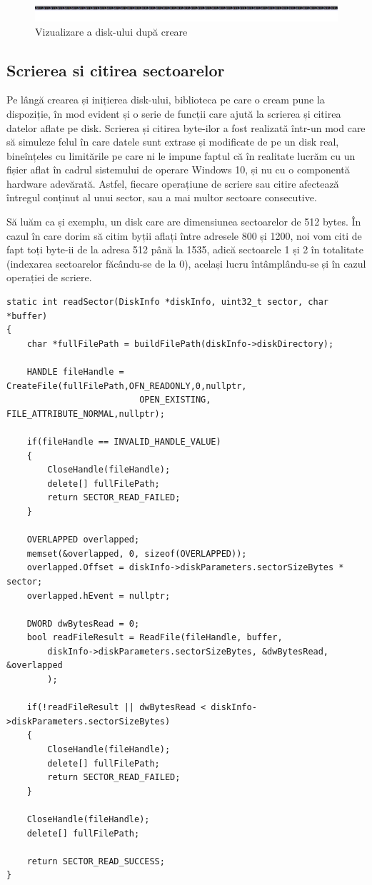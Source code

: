 \begin{figure}[h]
    \centering
    \includegraphics[width=1.0\linewidth]{images/2.2.png}
    \caption{Vizualizare a disk-ului după creare}
    \label{fig:enter-label}
\end{figure}


\subsection{Scrierea si citirea sectoarelor}

Pe lângă crearea și inițierea disk-ului, biblioteca pe care o cream pune la dispoziție, în mod evident și o serie de funcții care ajută la scrierea și citirea datelor aflate pe disk. Scrierea și citirea byte-ilor a fost realizată într-un mod care să simuleze felul în care datele sunt extrase și modificate de pe un disk real, bineînțeles cu limitările pe care ni le impune faptul că în realitate lucrăm cu un fișier aflat în cadrul sistemului de operare Windows 10, și nu cu o componentă hardware adevărată. Astfel, fiecare operațiune de scriere sau citire afectează întregul conținut al unui sector, sau a mai multor sectoare consecutive.

Să luăm ca și exemplu, un disk care are dimensiunea sectoarelor de 512 bytes. În cazul în care dorim să citim byții aflați între adresele 800 și 1200, noi vom citi de fapt toți byte-ii de la adresa 512 până la 1535, adică sectoarele 1 și 2 în totalitate (indexarea sectoarelor făcându-se de la 0), același lucru întâmplându-se și în cazul operației de scriere.

\bigskip

\lstset{style=code-snyppet-style}
\begin{lstlisting}
static int readSector(DiskInfo *diskInfo, uint32_t sector, char *buffer)
{
    char *fullFilePath = buildFilePath(diskInfo->diskDirectory);

    HANDLE fileHandle = CreateFile(fullFilePath,OFN_READONLY,0,nullptr,
                          OPEN_EXISTING, FILE_ATTRIBUTE_NORMAL,nullptr);

    if(fileHandle == INVALID_HANDLE_VALUE)
    {
        CloseHandle(fileHandle);
        delete[] fullFilePath;
        return SECTOR_READ_FAILED;
    }

    OVERLAPPED overlapped;
    memset(&overlapped, 0, sizeof(OVERLAPPED));
    overlapped.Offset = diskInfo->diskParameters.sectorSizeBytes * sector;
    overlapped.hEvent = nullptr;

    DWORD dwBytesRead = 0;
    bool readFileResult = ReadFile(fileHandle, buffer, 
        diskInfo->diskParameters.sectorSizeBytes, &dwBytesRead, &overlapped
        );

    if(!readFileResult || dwBytesRead < diskInfo->diskParameters.sectorSizeBytes)
    {
        CloseHandle(fileHandle);
        delete[] fullFilePath;
        return SECTOR_READ_FAILED;
    }

    CloseHandle(fileHandle);
    delete[] fullFilePath;

    return SECTOR_READ_SUCCESS;
}
\end{lstlisting}

